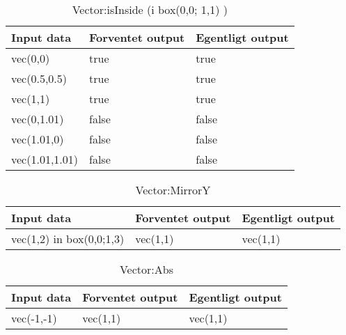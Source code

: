 \begin{table}[!h]
	\caption{Vector:isInside (i box(0,0; 1,1) )}
	\centering
	\begin{tabular}{L L L}
		\hline\hline
		Input data & Forventet output & Egentligt output \\ [0.5ex]
		\hline
		vec(0,0) & true & true\\
		vec(0.5,0.5) & true & true\\
		vec(1,1) & true & true\\
		vec(0,1.01) & false & false\\
		vec(1.01,0) & false & false\\
		vec(1.01,1.01) & false & false\\
		\hline
	\end{tabular}
\end{table}

\begin{table}[!h]
	\caption{Vector:MirrorY}
	\centering
	\begin{tabular}{L L L}
		\hline\hline
		Input data & Forventet output & Egentligt output \\ [0.5ex]
		\hline
		vec(1,2) in box(0,0;1,3) & vec(1,1) & vec(1,1)\\
		\hline
	\end{tabular}
\end{table}

\begin{table}[!h]
	\caption{Vector:Abs}
	\centering
	\begin{tabular}{L L L}
		\hline\hline
		Input data & Forventet output & Egentligt output \\ [0.5ex]
		\hline
		vec(-1,-1) & vec(1,1) & vec(1,1)\\
		\hline
	\end{tabular}
\end{table}

